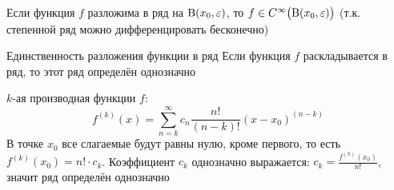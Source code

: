 \begin{zam}
	Если функция $f$ разложима в ряд на $\mathrm B(x_0, \varepsilon)$, то $f \in C^{\infty} \bigl(\mathrm B(x_0, \varepsilon)\bigr)$ (т.к. степенной ряд можно дифференцировать бесконечно)
\end{zam}

\begin{teor}[https://www.youtube.com/live/OdDauqCjZt0?si=LIoWv_Gjy4NYWsU4&t=1096]{Единственность разложения функции в ряд}
	Если функция $f$ раскладывается в ряд, то этот ряд определён однозначно 
\end{teor}

\begin{prf}
	$k$-ая производная функции $f$:
	\[f^{(k)}(x) = \sum_{n = k}^{\infty} c_n \frac{n!}{(n - k)!}(x - x_0)^{(n - k)}\]
	В точке $x_0$ все слагаемые будут равны нулю, кроме первого, то есть $f^{(k)}(x_0) = n! \cdot c_k$. Коэффициент $c_k$ однозначно выражается: $c_k = \frac{f^{(k)}(x_0)}{n!}$, значит ряд определён однозначно
\end{prf}